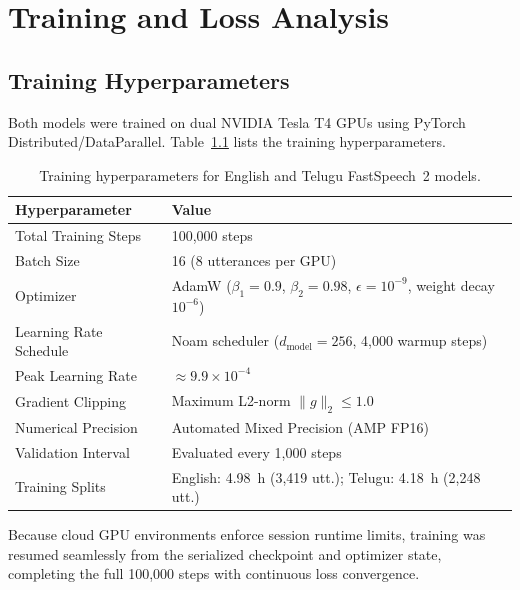 \documentclass[11pt,a4paper]{report}
\begin{document}
\FloatBarrier
\vspace{1.5em}

\chapter{Training and Loss Analysis}

\section{Training Hyperparameters}
Both models were trained on dual NVIDIA Tesla T4 GPUs using PyTorch Distributed/DataParallel. Table~\ref{tab:hyperparams} lists the training hyperparameters.

\begin{table}[!htbp]
\centering
\caption{Training hyperparameters for English and Telugu FastSpeech~2 models.}
\label{tab:hyperparams}
\small
\begin{tabularx}{\textwidth}{lX}
\toprule
\textbf{Hyperparameter} & \textbf{Value} \\
\midrule
Total Training Steps & 100{,}000 steps \\
Batch Size & 16 (8 utterances per GPU) \\
Optimizer & AdamW ($\beta_1=0.9$, $\beta_2=0.98$, $\epsilon=10^{-9}$, weight decay $10^{-6}$) \\
Learning Rate Schedule & Noam scheduler ($d_{\text{model}}=256$, 4{,}000 warmup steps) \\
Peak Learning Rate & $\approx 9.9 \times 10^{-4}$ \\
Gradient Clipping & Maximum L2-norm $\|g\|_2 \le 1.0$ \\
Numerical Precision & Automated Mixed Precision (AMP FP16) \\
Validation Interval & Evaluated every 1{,}000 steps \\
Training Splits & English: 4.98~h (3{,}419 utt.); Telugu: 4.18~h (2{,}248 utt.) \\
\bottomrule
\end{tabularx}
\end{table}

Because cloud GPU environments enforce session runtime limits, training was resumed seamlessly from the serialized checkpoint and optimizer state, completing the full 100{,}000 steps with continuous loss convergence.
\end{document}
